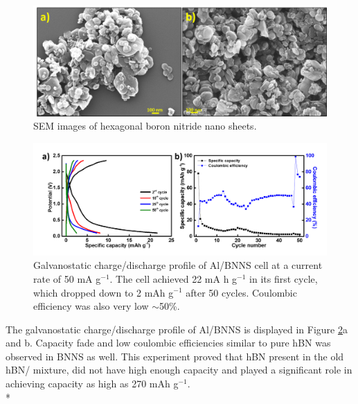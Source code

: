 \begin{figure}[tbh!]
\centering
\includegraphics[width=\textwidth]{Figures/BOhBN/BNNSSEM}
\caption{SEM images of hexagonal boron nitride nano sheets.}
\label{Figures/BOhBN:BNNSSEM}
\end{figure}

\begin{figure}[tbh!]
\centering
\includegraphics[width=\textwidth]{Figures/BOhBN/BNNSCDCCE}
\caption{Galvanostatic charge/discharge profile of Al/BNNS cell at a current rate of 50 mA g$^{-1}$. The cell achieved 22 mA h g$^{-1}$ in its first cycle, which dropped down to 2 mAh g$^{-1}$ after 50 cycles. Coulombic efficiency was also very low $\sim$50\%. }
\label{Figures/BOhBN:BNNSCDCCE}
\end{figure}

The galvanostatic charge/discharge profile of Al/BNNS is displayed in Figure \ref{Figures/BOhBN:BNNSCDCCE}a and b. Capacity fade and low coulombic efficiencies similar to pure hBN was observed in BNNS as well. This experiment proved that hBN present in the old hBN/ mixture, did not have high enough capacity and  played a significant role in achieving capacity as high as 270 mAh g$^{-1}$. \\*

